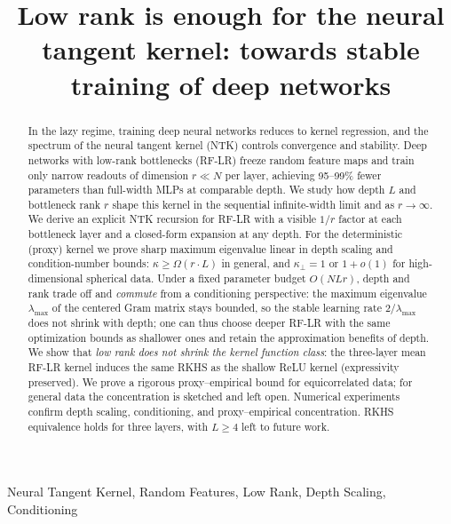 \documentclass[anon]{colt2026} %
\title[Low rank is enough for the NTK]{Low rank is enough for the neural tangent kernel: towards stable training of deep networks}
\begin{document}
\maketitle

\begin{abstract}

In the lazy regime, training deep neural networks reduces to kernel regression, and the spectrum of the neural tangent kernel (NTK) controls convergence and stability. Deep networks with low-rank bottlenecks (RF-LR) freeze random feature maps and train only narrow readouts of dimension \(r\ll N\) per layer, achieving 95--99\% fewer parameters than full-width MLPs at comparable depth. We study how depth \(L\) and bottleneck rank \(r\) shape this kernel in the sequential infinite-width limit and as \(r\to\infty\). We derive an explicit NTK recursion for RF-LR with a visible \(1/r\) factor at each bottleneck layer and a closed-form expansion at any depth. For the deterministic (proxy) kernel we prove sharp maximum eigenvalue linear in depth scaling and condition-number bounds: \(\kappa\ge\Omega(r\cdot L)\) in general, and \(\kappa_\perp=1\) or \(1+o(1)\) for high-dimensional spherical data. Under a fixed parameter budget \(O(NLr)\), depth and rank trade off and \emph{commute} from a conditioning perspective: the maximum eigenvalue \(\lambda_{\max}\) of the centered Gram matrix stays bounded, so the stable learning rate \(2/\lambda_{\max}\) does not shrink with depth; one can thus choose deeper RF-LR with the same optimization bounds as shallower ones and retain the approximation benefits of depth. We show that \emph{low rank does not shrink the kernel function class}: the three-layer mean RF-LR kernel induces the same RKHS as the shallow ReLU kernel (expressivity preserved). We prove a rigorous proxy--empirical bound for equicorrelated data; for general data the concentration is sketched and left open. Numerical experiments confirm depth scaling, conditioning, and proxy--empirical concentration. RKHS equivalence holds for three layers, with \(L\ge 4\) left to future work.
\end{abstract}

\begin{keywords}
Neural Tangent Kernel, Random Features, Low Rank, Depth Scaling, Conditioning
\end{keywords}










\appendix


\end{document}
